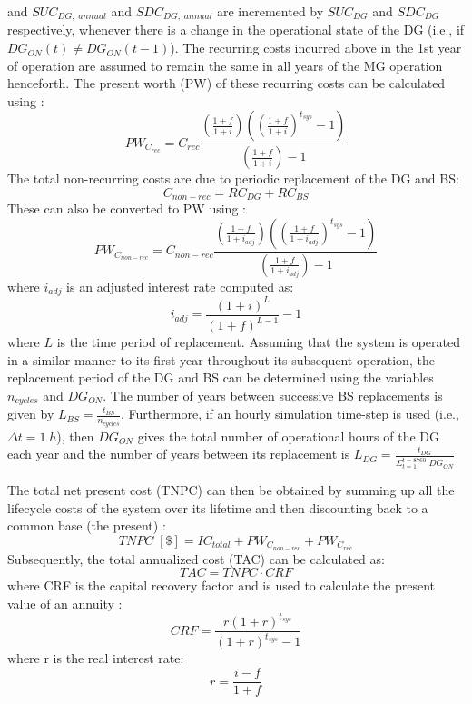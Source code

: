 \documentclass[final,3p,times]{elsarticle}
\begin{document}
and $SUC_{DG,\;annual}$ and $SDC_{DG,\;annual}$ are incremented by $SUC_{DG}$ and $SDC_{DG}$ respectively, whenever there is a change in the operational state of the DG (i.e., if $DG_{ON}(t) \neq DG_{ON}(t-1)$). The recurring costs incurred above in the 1st year of operation are assumed to remain the same in all years of the MG operation henceforth. The present worth (PW) of these recurring costs can be calculated using \cite{lcc,ajan2003}:
\begin{equation}
    PW_{C_{rec}} = C_{rec} \frac{\left(\frac{1+f}{1+i}\right)\left(\left(\frac{1+f}{1+i}\right)^{t_{sys}} - 1\right)}{\left(\frac{1+f}{1+i}\right)- 1}
\end{equation}
The total non-recurring costs are due to periodic replacement of the DG and BS: 
\begin{equation}
    C_{non-rec} = RC_{DG} + RC _{BS}
\end{equation}
These can also be converted to PW using \cite{lcc,ajan2003}:
\begin{equation}
    PW_{C_{non-rec}} = C_{non-rec} \frac{\left(\frac{1+f}{1+i_{adj}}\right)\left(\left(\frac{1+f}{1+i_{adj}}\right)^{t_{sys}} - 1\right)}{\left(\frac{1+f}{1+i_{adj}}\right)- 1}
\end{equation}
where $i_{adj}$ is an adjusted interest rate computed as:
\begin{equation}
    i_{adj} = \frac{(1+i)^L}{(1+f)^{L-1}} - 1
\end{equation}
where $L$ is the time period of replacement. Assuming that the system is operated in a similar manner to its first year throughout its subsequent operation, the replacement period of the DG and BS can be determined using the variables $n_{cycles}$ and $DG_{ON}$. The number of years between successive BS replacements is given by $L_{BS} = \frac{t_{BS}}{n_{cycles}}$. Furthermore, if an hourly simulation time-step is used (i.e., $\Delta t = 1 \; h$), then $DG_{ON}$ gives the total number of operational hours of the DG each year and the number of years between its replacement is $L_{DG} = \frac{t_{DG}}{\Sigma_{t=1}^{t=8760} \; DG_{ON}}$
    
The total net present cost (TNPC) can then be obtained by summing up all the lifecycle costs of the system over its lifetime and then discounting back to a common base (the present) \cite{kaabeche2011a}: 
\begin{equation}
    TNPC \; [\$] = IC_{total} + PW_{C_{non-rec}} + PW_{C_{rec}}
\end{equation}
Subsequently, the total annualized cost (TAC) can be calculated as:
\begin{equation}
    TAC = TNPC \cdot CRF 
\end{equation}
where CRF is the capital recovery factor and is used to calculate the present value of an annuity \cite{kaviani2009}:
\begin{equation}
    CRF = \frac{r(1+r)^{t_{sys}}}{(1+r)^{t_{sys}} - 1}
\end{equation}
where r is the real interest rate:
\begin{equation}
\label{eq:real_interest}
    r = \frac{i-f}{1 + f}
\end{equation}
\end{document}
